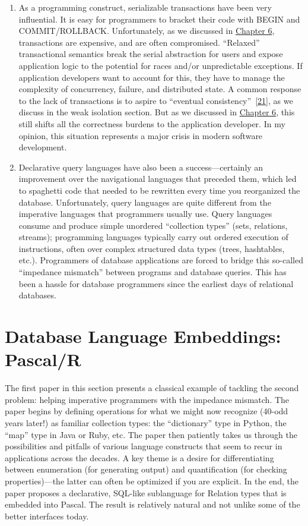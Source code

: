 \documentclass[b5paper,11pt,twoside,openright]{book}
\newcommand\Section[2]{
  \hypertarget{#1}{
    \section{#2}
  }
}
\begin{document}
\begin{enumerate}
  \item
  As a programming construct, serializable transactions have been very
  influential. It is easy for programmers to bracket their code with
  BEGIN and COMMIT/ROLLBACK. Unfortunately, as we discussed in
  \hyperref[ch6-isolation]{Chapter 6}, transactions are expensive, and
  are often compromised. ``Relaxed'' transactional semantics break the
  serial abstraction for users and expose application logic to the
  potential for races and/or unpredictable exceptions. If application
  developers want to account for this, they have to manage the
  complexity of concurrency, failure, and distributed state. A common
  response to the lack of transactions is to aspire to ``eventual
  consistency''~{{[}\protect\hyperlink{ref-bayou-session}{21}{]}}, as we
  discuss in the weak isolation section. But as we discussed in
  \hyperref[ch6-isolation]{Chapter 6}, this still shifts all the
  correctness burdens to the application developer. In my opinion, this
  situation represents a major crisis in modern software development.
  \item
  Declarative query languages have also been a success---certainly an
  improvement over the navigational languages that preceded them, which
  led to spaghetti code that needed to be rewritten every time you
  reorganized the database. Unfortunately, query languages are quite
  different from the imperative languages that programmers usually use.
  Query languages consume and produce simple unordered ``collection
  types'' (sets, relations, streams); programming languages typically
  carry out ordered execution of instructions, often over complex
  structured data types (trees, hashtables, etc.). Programmers of
  database applications are forced to bridge this so-called ``impedance
  mismatch'' between programs and database queries. This has been a
  hassle for database programmers since the earliest days of relational
  databases.
\end{enumerate}

\Section{database-language-embeddings-pascalr}{%
Database Language Embeddings: Pascal/R
}

The first paper in this section presents a classical example of tackling
the second problem: helping imperative programmers with the impedance
mismatch. The paper begins by defining operations for what we might now
recognize (40-odd years later!) as familiar collection types: the
``dictionary'' type in Python, the ``map'' type in Java or Ruby, etc.
The paper then patiently takes us through the possibilities and pitfalls
of various language constructs that seem to recur in applications across
the decades. A key theme is a desire for differentiating between
enumeration (for generating output) and quantification (for checking
properties)---the latter can often be optimized if you are explicit. In
the end, the paper proposes a declarative, SQL-like sublanguage for
Relation types that is embedded into Pascal. The result is relatively
natural and not unlike some of the better interfaces today.
\end{document}
